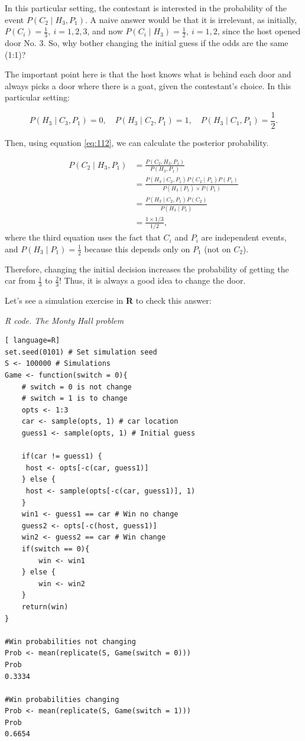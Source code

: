 In this particular setting, the contestant is interested in the probability of the event \( P(C_2 \mid H_3, P_1) \). A naive answer would be that it is irrelevant, as initially, \( P(C_i) = \frac{1}{3}, \ i = 1, 2, 3 \), and now \( P(C_i \mid H_3) = \frac{1}{2}, \ i = 1, 2 \), since the host opened door No. 3. So, why bother changing the initial guess if the odds are the same (1:1)?

The important point here is that the host knows what is behind each door and always picks a door where there is a goat, given the contestant's choice. In this particular setting:

\[
P(H_3 \mid C_3, P_1) = 0, \quad P(H_3 \mid C_2, P_1) = 1, \quad P(H_3 \mid C_1, P_1) = \frac{1}{2}.
\]

Then, using equation \ref{eq:112}, we can calculate the posterior probability.

\begin{align*}
	P(C_2\mid H_3,P_1)&= \frac{P(C_2,H_3,P_1)}{P(H_3,P_1)}\\
	&= \frac{P(H_3\mid C_2,P_1)P(C_2\mid P_1)P(P_1)}{P(H_3\mid P_1)\times P(P_1)}\\
	&= \frac{P(H_3\mid C_2,P_1)P(C_2)}{P(H_3\mid P_1)}\\
	&=\frac{1\times 1/3}{1/2},
\end{align*}
where the third equation uses the fact that \( C_i \) and \( P_i \) are independent events, and \( P(H_3 \mid P_1) = \frac{1}{2} \) because this depends only on \( P_1 \) (not on \( C_2 \)).

Therefore, changing the initial decision increases the probability of getting the car from \( \frac{1}{3} \) to \( \frac{2}{3} \)! Thus, it is always a good idea to change the door.

Let's see a simulation exercise in \textbf{R} to check this answer:


\begin{tcolorbox}[enhanced,width=4.67in,center upper,
	fontupper=\large\bfseries,drop shadow southwest,sharp corners]
\textit{R code. The Monty Hall problem}
\begin{VF}
\begin{lstlisting}[ language=R]
set.seed(0101) # Set simulation seed
S <- 100000 # Simulations
Game <- function(switch = 0){
	# switch = 0 is not change  
	# switch = 1 is to change
	opts <- 1:3 
	car <- sample(opts, 1) # car location
	guess1 <- sample(opts, 1) # Initial guess 
	
	if(car != guess1) {
	 host <- opts[-c(car, guess1)]
	} else {
	 host <- sample(opts[-c(car, guess1)], 1)
	}	
	win1 <- guess1 == car # Win no change
	guess2 <- opts[-c(host, guess1)]	
	win2 <- guess2 == car # Win change
	if(switch == 0){
		win <- win1
	} else {
		win <- win2
	}
	return(win)
}

#Win probabilities not changing
Prob <- mean(replicate(S, Game(switch = 0))) 
Prob
0.3334

#Win probabilities changing
Prob <- mean(replicate(S, Game(switch = 1))) 
Prob
0.6654
\end{lstlisting}
\end{VF}
\end{tcolorbox}

